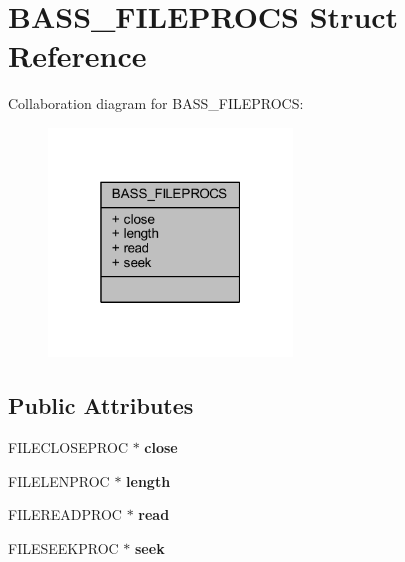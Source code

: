 \hypertarget{struct_b_a_s_s___f_i_l_e_p_r_o_c_s}{\section{B\-A\-S\-S\-\_\-\-F\-I\-L\-E\-P\-R\-O\-C\-S Struct Reference}
\label{struct_b_a_s_s___f_i_l_e_p_r_o_c_s}
}


Collaboration diagram for B\-A\-S\-S\-\_\-\-F\-I\-L\-E\-P\-R\-O\-C\-S\-:\nopagebreak
\begin{figure}[H]
\begin{center}
\leavevmode
\includegraphics[width=184pt]{struct_b_a_s_s___f_i_l_e_p_r_o_c_s__coll__graph}
\end{center}
\end{figure}
\subsection*{Public Attributes}
\begin{DoxyCompactItemize}
\item 
\hypertarget{struct_b_a_s_s___f_i_l_e_p_r_o_c_s_ad59646dcd884fd17f03f287aa4357f41_ad59646dcd884fd17f03f287aa4357f41}{F\-I\-L\-E\-C\-L\-O\-S\-E\-P\-R\-O\-C $\ast$ {\bfseries close}}\label{struct_b_a_s_s___f_i_l_e_p_r_o_c_s_ad59646dcd884fd17f03f287aa4357f41_ad59646dcd884fd17f03f287aa4357f41}

\item 
\hypertarget{struct_b_a_s_s___f_i_l_e_p_r_o_c_s_ac1f07354d8eac94a95391c6f5c12529f_ac1f07354d8eac94a95391c6f5c12529f}{F\-I\-L\-E\-L\-E\-N\-P\-R\-O\-C $\ast$ {\bfseries length}}\label{struct_b_a_s_s___f_i_l_e_p_r_o_c_s_ac1f07354d8eac94a95391c6f5c12529f_ac1f07354d8eac94a95391c6f5c12529f}

\item 
\hypertarget{struct_b_a_s_s___f_i_l_e_p_r_o_c_s_a8492fd4a894c34f80c7417c23bf7306d_a8492fd4a894c34f80c7417c23bf7306d}{F\-I\-L\-E\-R\-E\-A\-D\-P\-R\-O\-C $\ast$ {\bfseries read}}\label{struct_b_a_s_s___f_i_l_e_p_r_o_c_s_a8492fd4a894c34f80c7417c23bf7306d_a8492fd4a894c34f80c7417c23bf7306d}

\item 
\hypertarget{struct_b_a_s_s___f_i_l_e_p_r_o_c_s_a1a84987b5f65ebfc09ab728a55922d72_a1a84987b5f65ebfc09ab728a55922d72}{F\-I\-L\-E\-S\-E\-E\-K\-P\-R\-O\-C $\ast$ {\bfseries seek}}\label{struct_b_a_s_s___f_i_l_e_p_r_o_c_s_a1a84987b5f65ebfc09ab728a55922d72_a1a84987b5f65ebfc09ab728a55922d72}

\end{DoxyCompactItemize}


